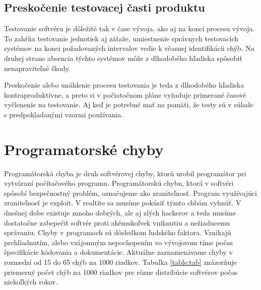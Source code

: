 \documentclass[10pt,twoside,slovak,a4paper]{article}
\begin{document}
\subsection{Preskočenie testovacej časti produktu}
Testovanie softvéru je dôležité tak v čase vývoja, ako aj na konci procesu vývoja. To zahŕňa testovanie jednotiek aj záťaže, umiestnenie správnych testovacích systémov na konci požadovaných intervalov vedie k včasnej identifikácii chýb. Na druhej strane absencia týchto systémov môže z dlhodobého hľadiska spôsobiť nenapraviteľné škody.

Preskočenie alebo unáhlenie procesu testovania je teda z dlhodobého hľadiska kontraproduktívne, a preto si v počiatočnom pláne vyžaduje primerané časové vyčlenenie na testovanie. Aj keď je potrebné mať na pamäti, že testy sú v súlade s predpokladanými vzormi používania.











\section{Programatorské chyby}
Programátorská chyba je druh softvérovej chyby, ktorú urobil programátor pri vytváraní počítačového programu. Programátorskú chybu, ktorá v softvéri spôsobí bezpečnostný problém, označujeme ako zraniteľnosť. Program využívajúci zraniteľnosť je exploit. V realtite sa musíme pokúsiť týmto chbám vyhnúť. V dnešnej dobe existuje mnoho dobrých, ale aj zlých hackerov a teda musíme dostatočne zabepečiť softvér proti akémukoľvek vniknutiu a nežiaducemu správaniu.
Chyby v programoch sú dôsledkom ľudského faktora. Vznikajú prehliadnutím, alebo vzájomným nepochopením vo vývojovom tíme počas špecifikácie kódovania a dokumentácie.
Aktuálne zaznamenávame chyby v rozmedzí od 15 do 65 chýb na 1000 riadkov.
Tabuľka \ref{table:tab} znázorňuje priemerný počet chýb na 1000 riadkov pre rôzne distribúcie softvérov počas niekoľkých rokov.
\end{document}
